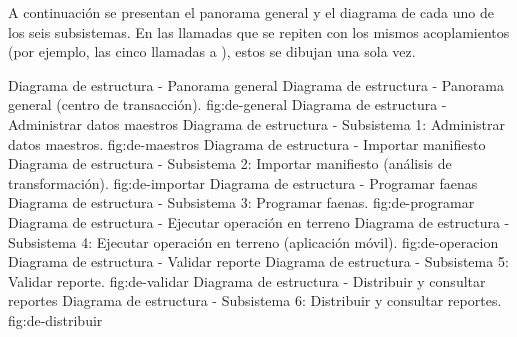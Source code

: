 A continuación se presentan el panorama general y el diagrama de cada uno de los seis
subsistemas. En las llamadas que se repiten con los mismos acoplamientos (por ejemplo, las
cinco llamadas a ), estos se dibujan una sola vez.

    {Diagrama de estructura - Panorama general}
    {Diagrama de estructura - Panorama general (centro de transacción).}
    {fig:de-general}
    {Diagrama de estructura - Administrar datos maestros}
    {Diagrama de estructura - Subsistema 1: Administrar datos maestros.}
    {fig:de-maestros}
    {Diagrama de estructura - Importar manifiesto}
    {Diagrama de estructura - Subsistema 2: Importar manifiesto (análisis de transformación).}
    {fig:de-importar}
    {Diagrama de estructura - Programar faenas}
    {Diagrama de estructura - Subsistema 3: Programar faenas.}
    {fig:de-programar}
    {Diagrama de estructura - Ejecutar operación en terreno}
    {Diagrama de estructura - Subsistema 4: Ejecutar operación en terreno (aplicación móvil).}
    {fig:de-operacion}
    {Diagrama de estructura - Validar reporte}
    {Diagrama de estructura - Subsistema 5: Validar reporte.}
    {fig:de-validar}
    {Diagrama de estructura - Distribuir y consultar reportes}
    {Diagrama de estructura - Subsistema 6: Distribuir y consultar reportes.}
    {fig:de-distribuir}
